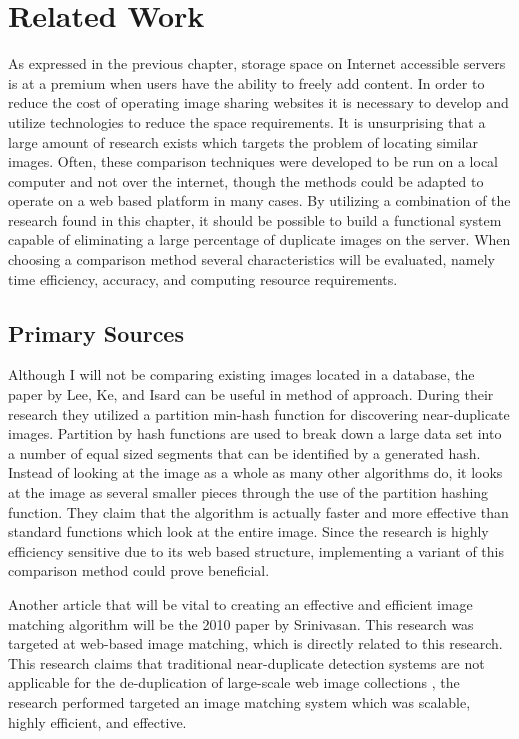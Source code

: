 %
%
\chapter{Related Work}\label{ch:relatedwork}

As expressed in the previous chapter, storage space on Internet accessible servers is at a premium when users have the ability to freely add content. In order to reduce the cost of operating image sharing websites it is necessary to develop and utilize technologies to reduce the space requirements. It is unsurprising that a large amount of research exists which targets the problem of locating similar images. Often, these comparison techniques were developed to be run on a local computer and not over the internet, though the methods could be adapted to operate on a web based platform in many cases. By utilizing a combination of the research found in this chapter, it should be possible to build a functional system capable of eliminating a large percentage of duplicate images on the server. When choosing a comparison method several characteristics will be evaluated, namely time efficiency, accuracy, and computing resource requirements.  

\section{Primary Sources}
Although I will not be comparing existing images located in a database, the paper by Lee, Ke, and Isard \cite{Lee:2010} can be useful in method of approach. During their research they utilized a partition min-hash function for discovering near-duplicate images. Partition by hash functions are used to break down a large data set into a number of equal sized segments that can be identified by a generated hash. Instead of looking at the image as a whole as many other algorithms do, it looks at the image as several smaller pieces through the use of the partition hashing function. They claim that the algorithm is actually faster and more effective than standard functions which look at the entire image. Since the research is highly efficiency sensitive due to its web based structure, implementing a variant of this comparison method could prove beneficial.

Another article that will be vital to creating an effective and efficient image matching algorithm will be the 2010 paper by Srinivasan. This research was targeted at web-based image matching, which is directly related to this research. This research claims that traditional near-duplicate detection systems are not applicable for the de-duplication of large-scale web image collections \cite{Srinivasan:2008}, the research performed targeted an image matching system which was scalable, highly efficient, and effective.

